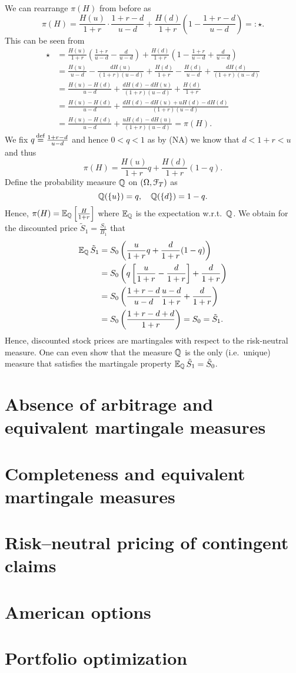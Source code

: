 \documentclass[12pt]{amsart}
\begin{document}
\begin{remark}
    We can rearrange \(\pi(H)\) from before as \[
        \pi(H) = \frac{H(u)}{1+r} \cdot \frac{1+r-d}{u-d} + \frac{H(d)}{1+r} \left(1-\frac{1+r-d}{u-d}\right) =: \star.
    \]
    This can be seen from \begin{align*}
        \star
        &= \frac{H(u)}{1+r}\left(\frac{1+r}{u-d}-\frac{d}{u-d}\right) + \frac{H(d)}{1+r}\left(1-\frac{1+r}{u-d}+\frac{d}{u-d}\right)\\
        &= \frac{H(u)}{u-d} - \frac{dH(u)}{(1+r)(u-d)} + \frac{H(d)}{1+r} - \frac{H(d)}{u-d} + \frac{d H(d)}{(1+r)(u-d)}\\
        &= \frac{H(u)-H(d)}{u-d} + \frac{dH(d)-dH(u)}{(1+r)(u-d)}+\frac{H(d)}{1+r}\\
        &= \frac{H(u)-H(d)}{u-d} + \frac{dH(d)-dH(u)+uH(d)-dH(d)}{(1+r)(u-d)}\\
        &= \frac{H(u)-H(d)}{u-d} + \frac{uH(d)-dH(u)}{(1+r)(u-d)} = \pi(H).
    \end{align*}
    We fix \(q \operatorname*{\stackrel{\operatorname{def}}{=}} \frac{1+r-d}{u-d}\) and hence \(0 < q < 1\) as by (NA) we know that \(d<1+r<u\) and thus \[
        \pi(H) = \frac{H(u)}{1+r}q+\frac{H(d)}{1+r}(1-q).
    \]
    Define the probability measure \(\mathbb{Q}\) on \((\Omega, \mathcal{F}_T)\) as \[
        \mathbb{Q}(\left\{ u \right\}) = q, \quad \mathbb{Q}(\left\{ d \right\})=1-q.
    \]
    Hence, \(\pi(H) = \operatorname{\mathbb{E}}_{\mathbb{Q}} \left[ \frac{H}{1+r} \right]\) where \(\operatorname{\mathbb{E}}_{\mathbb{Q}}\) is the expectation w.r.t.\ \(\mathbb{Q}\).
    We obtain for the discounted price \(\tilde{S}_1 = \frac{S_1}{B_1}\) that
    \begin{align*}
        \operatorname{\mathbb{E}}_{\mathbb{Q}} \tilde{S}_1
        &= S_0 \left( \frac{u}{1+r}q + \frac{d}{1+r}(1-q) \right)\\
        &= S_0 \left( q \left[ \frac{u}{1+r}-\frac{d}{1+r} \right] + \frac{d}{1+r} \right)\\
        &= S_0 \left( \frac{1+r-d}{u-d} \frac{u-d}{1+r} + \frac{d}{1+r} \right)\\
        &= S_0 \left( \frac{1+r-d+d}{1+r} \right) = S_0 = \tilde{S}_1.
    \end{align*}
    Hence, discounted stock prices are martingales with respect to the risk-neutral measure. One can even show that the measure \(\mathbb{Q}\) is the only (i.e.\ unique) measure that satisfies the martingale property \(\operatorname{\mathbb{E}}_{\mathbb{Q}} \tilde{S}_1 = \tilde{S}_0\).
\end{remark}

\section{Absence of arbitrage and equivalent martingale measures}
\section{Completeness and equivalent martingale measures}
\section{Risk--neutral pricing of contingent claims}
\section{American options}
\section{Portfolio optimization}
\end{document}
